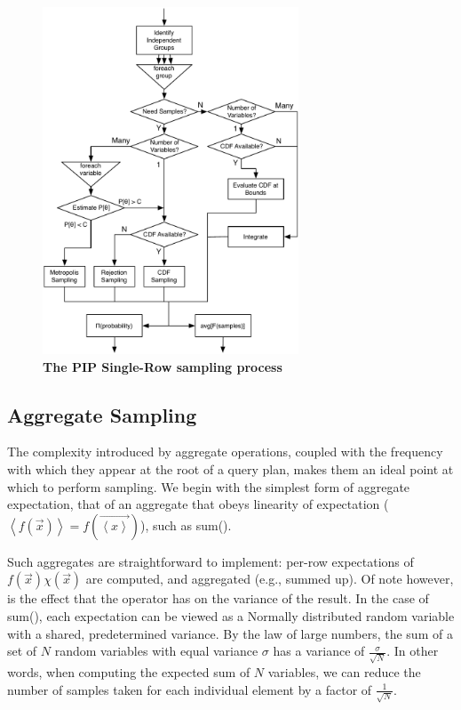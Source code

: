 \begin{figure}
\begin{center}
\includegraphics[width=3in]{graphics/roadmap.pdf}
\caption{\textbf{The PIP Single-Row sampling process}}
\label{fig:roadmap}
\end{center}
\end{figure}

\subsection{Aggregate Sampling}
The complexity introduced by aggregate operations, coupled with the frequency with which they appear at the root of a query plan, makes them an ideal point at which to perform sampling.  We begin with the simplest form of aggregate expectation, that of an aggregate that obeys linearity of expectation ($\left<f(\vec{x})\right> = f(\vec{\left<x\right>})$), such as sum().  

Such aggregates are straightforward to implement: per-row expectations of $f(\vec x)\chi(\vec x)$ are computed, and aggregated (e.g., summed up).  Of note however, is the effect that the operator has on the variance of the result.  In the case of sum(), each expectation can be viewed as a Normally distributed random variable with a shared, predetermined variance.  By the law of large numbers, the sum of a set of $N$ random variables with equal variance $\sigma$ has a variance of $\frac{\sigma}{\sqrt{N}}$.  In other words, when computing the expected sum of $N$ variables, we can reduce the number of samples taken for each individual element by a factor of $\frac{1}{\sqrt{N}}$.

